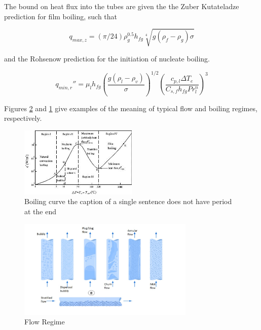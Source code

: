 \documentclass[compileTAMUreport.tex]{subfiles}
\begin{document}
The bound on heat flux into the tubes are given the the Zuber Kutateladze prediction for film boiling, such that

\begin{equation}
q_{max,z} = (\pi/24)\rho_g^{0.5} h_{fg} \sqrt[4]{g (\rho_{f} - \rho_{g}) \sigma}
\end{equation}

and the Rohsenow prediction for the initiation of nucleate boiling. 
\cite{Incropera}

\begin{equation}
q_{min,r}'' = \mu_l h_{fg} \left( \frac{g (\rho_l - \rho_v)}{\sigma} \right)^{1/2} \left( \frac{c_{p,l} \Delta T_e}{C_{s,f} h_{fg} Pr_l^n} \right)^3
\end{equation}

Figures \ref{fig:flowregime} and \ref{fig:boilingregime} give examples of the meaning of typical flow and boiling regimes, respectively.

\begin{figure}
\centering
\includegraphics[width=0.5\textwidth]{./figure/400px-Boiling}
\caption{Boiling curve the caption of a single sentence does not have period at the end}
\label{fig:boilingregime}
\end{figure}

\begin{figure}[t]
\begin{center}
\includegraphics[width=0.75\textwidth]{./figure/flow_regime}
\end{center}
\caption{Flow Regime}
\label{fig:flowregime}
\end{figure}
\end{document}
